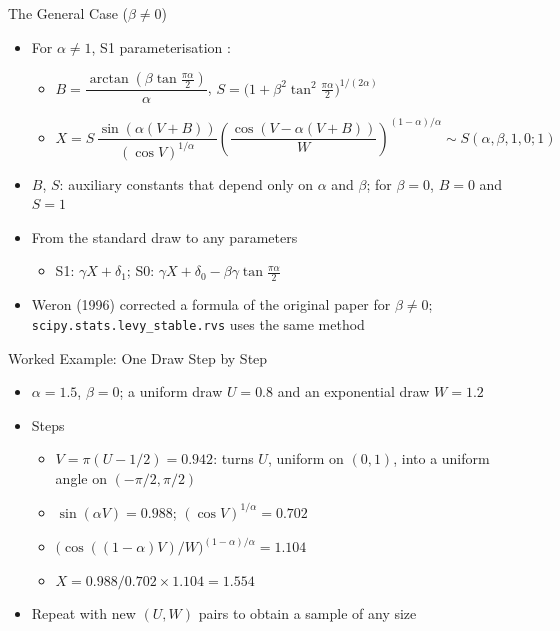 \begin{frame}{The General Case ($\beta \ne 0$)}
\itemsize{\small}
\begin{itemize}
    \item For $\alpha \ne 1$, S1 parameterisation :
    \begin{itemize}
        \item $B = \dfrac{\arctan(\beta\tan\frac{\pi\alpha}{2})}{\alpha}$, \quad $S = \Big(1 + \beta^2\tan^2\frac{\pi\alpha}{2}\Big)^{1/(2\alpha)}$
        \item $X = S\,\dfrac{\sin(\alpha(V + B))}{(\cos V)^{1/\alpha}} \left(\dfrac{\cos(V - \alpha(V + B))}{W}\right)^{(1 - \alpha)/\alpha} \sim S(\alpha, \beta, 1, 0; 1)$
    \end{itemize}
    \item $B$, $S$: auxiliary constants that depend only on $\alpha$ and $\beta$; for $\beta = 0$, $B = 0$ and $S = 1$
    \item From the standard draw to any parameters
    \begin{itemize}
        \item S1: $\gamma X + \delta_1$; S0: $\gamma X + \delta_0 - \beta\gamma\tan\frac{\pi\alpha}{2}$
    \end{itemize}
    \item Weron (1996) corrected a formula of the original paper for $\beta \ne 0$; \texttt{scipy.stats.levy\_stable.rvs} uses the same method
\end{itemize}
\end{frame}

\begin{frame}{Worked Example: One Draw Step by Step}
\itemsize{\small}
\begin{itemize}
    \item $\alpha = 1.5$, $\beta = 0$; a uniform draw $U = 0.8$ and an exponential draw $W = 1.2$
    \item Steps
    \begin{itemize}
        \item $V = \pi(U - 1/2) = 0.942$: turns $U$, uniform on $(0, 1)$, into a uniform angle on $(-\pi/2, \pi/2)$
        \item $\sin(\alpha V) = 0.988$; $(\cos V)^{1/\alpha} = 0.702$
        \item $\big(\cos((1 - \alpha)V)/W\big)^{(1 - \alpha)/\alpha} = 1.104$
        \item $X = 0.988/0.702 \times 1.104 = 1.554$
    \end{itemize}
    \item Repeat with new $(U, W)$ pairs to obtain a sample of any size
\end{itemize}
\end{frame}

